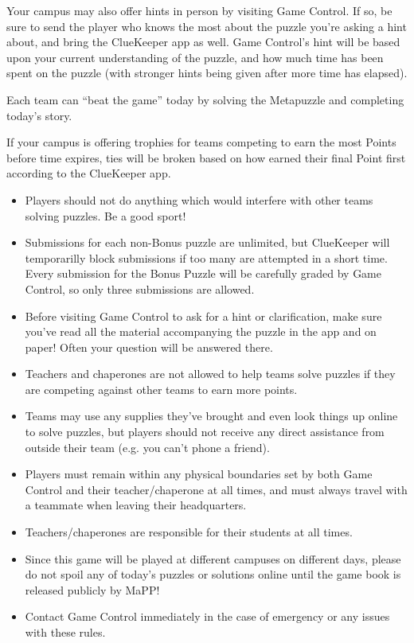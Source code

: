Your campus may also offer hints in person by visiting Game Control.
If so, be sure to send the player who knows the most about the puzzle you're
asking a hint about, and bring the ClueKeeper app as well. Game Control's
hint will be based upon your current understanding of the puzzle, and how much
time has been spent on the puzzle (with stronger hints being given after more
time has elapsed).


Each team can ``beat the game'' today by solving the Metapuzzle and
completing today's story.

If your campus is offering trophies for teams competing to earn
the most Points before time expires, ties will be broken based
on how earned their final Point first according to the ClueKeeper app.


\begin{itemize}
\item Players should not do anything which
would interfere with other teams solving puzzles. Be a good sport!
\item Submissions for each non-Bonus puzzle are unlimited, but ClueKeeper
will temporarilly block submissions if too many are attempted in a short time.
Every submission for the Bonus Puzzle will be carefully graded by Game Control,
so only three submissions are allowed.
\item Before visiting Game Control to ask for a hint or clarification, make
sure you've read all the material accompanying the puzzle in the app and
on paper! Often your question will be answered there.
\item Teachers and chaperones are not allowed to help teams solve
puzzles if they are competing against other teams to earn more points.
\item Teams may use any supplies they've brought and even
look things up online to solve puzzles, but players should not receive any direct
assistance from outside their team (e.g. you can't phone a friend).
\item Players must remain within any physical boundaries set by both
Game Control and their teacher/chaperone at all times, and must always
travel with a teammate when leaving their headquarters.
\item Teachers/chaperones are responsible for their students at
all times.
\item Since this game will be played at different campuses on different
days, please do not spoil any of today's puzzles or solutions online until
the game book is released publicly by MaPP!
\item Contact Game Control immediately in the case of emergency
or any issues with these rules.
\end{itemize}

